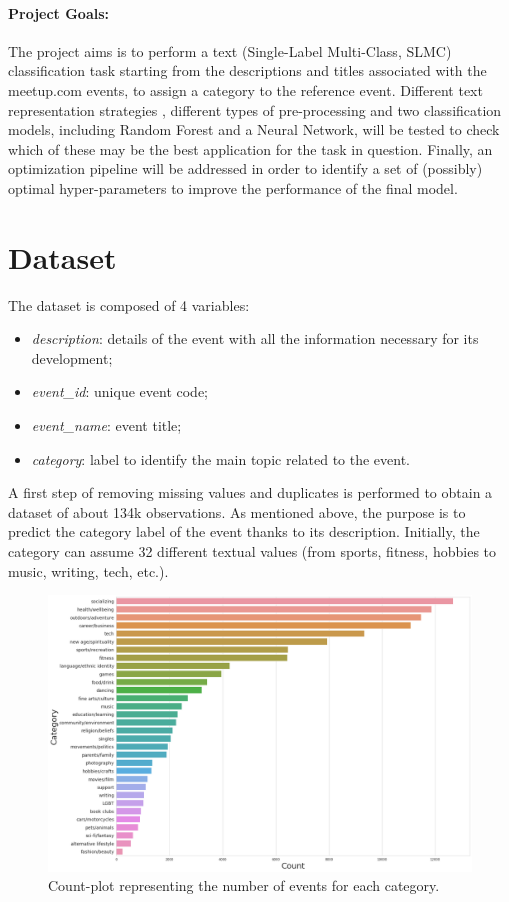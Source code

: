 \documentclass[10pt]{article}
\begin{document}
\paragraph{Project Goals:}
The project aims is to perform a text (Single-Label Multi-Class, SLMC) classification task  starting from the descriptions and titles associated with the meetup.com events, to assign a category to the reference event.
Different text representation strategies , different types of pre-processing and two classification models, including Random Forest and a Neural Network, will be tested to check which of these may be the best application for the task in question.
Finally, an optimization pipeline will be addressed in order to identify a set of (possibly) optimal hyper-parameters to improve the performance of the final model.

\section{Dataset \label{sec:datasets}}
The dataset %
is composed of 4 variables:
\begin{itemize}
\item \textit{description}: details of the event with all the information necessary for its development;
\item \textit{event\_id}: unique event code;
\item \textit{event\_name}: event title;
\item \textit{category}: label to identify the main topic related to the event.
\end{itemize}
A first step of removing missing values and duplicates is performed to obtain a dataset of about 134k observations.
As mentioned above, the purpose is to predict the category label of the event thanks to its description. Initially, the category can assume 32 different textual values (from sports, fitness, hobbies to music, writing, tech, etc.).
\begin{figure}
\centering
\includegraphics[scale=0.35]{figs/dist.png}
\caption{\label{fig:dist}Count-plot representing the number of events for each category.}
\end{figure}
\end{document}
